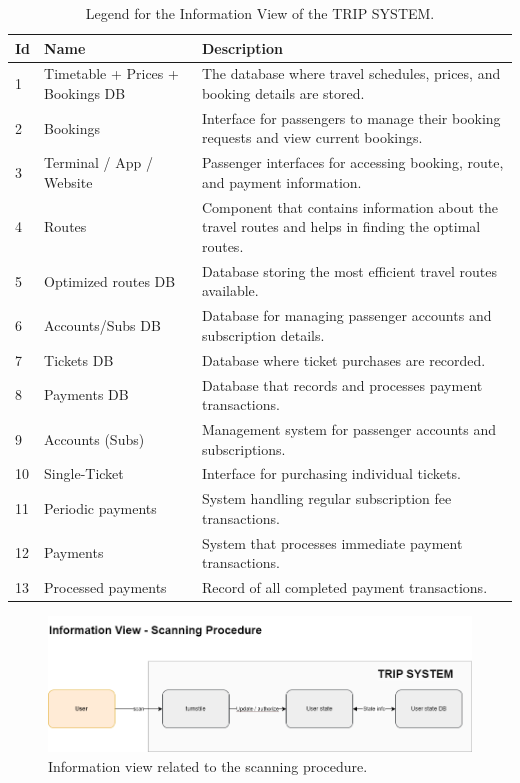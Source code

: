 \begin{table}[H]
    \centering
    \caption{Legend for the Information View of the TRIP SYSTEM.}
    \label{tab:information_view_legend}
    \begin{tabular}{@{}llp{10cm}@{}}
    \toprule
    \textbf{Id} & \textbf{Name} & \textbf{Description} \\
    \midrule
    1 & Timetable + Prices + Bookings DB & The database where travel schedules, prices, and booking details are stored. \\
    2 & Bookings & Interface for passengers to manage their booking requests and view current bookings. \\
    3 & Terminal / App / Website & Passenger interfaces for accessing booking, route, and payment information. \\
    4 & Routes & Component that contains information about the travel routes and helps in finding the optimal routes. \\
    5 & Optimized routes DB & Database storing the most efficient travel routes available. \\
    6 & Accounts/Subs DB & Database for managing passenger accounts and subscription details. \\
    7 & Tickets DB & Database where ticket purchases are recorded. \\
    8 & Payments DB & Database that records and processes payment transactions. \\
    9 & Accounts (Subs) & Management system for passenger accounts and subscriptions. \\
    10 & Single-Ticket & Interface for purchasing individual tickets. \\
    11 & Periodic payments & System handling regular subscription fee transactions. \\
    12 & Payments & System that processes immediate payment transactions. \\
    13 & Processed payments & Record of all completed payment transactions. \\
    \bottomrule
\end{tabular}
\end{table}

\begin{figure}[H]
    \centering
    \includegraphics[width=\textwidth]{drawings/views_final_version/information_view scanning.png}
    \caption{Information view related to the scanning procedure.}
    \label{fig:information_view_scanning}
\end{figure}

